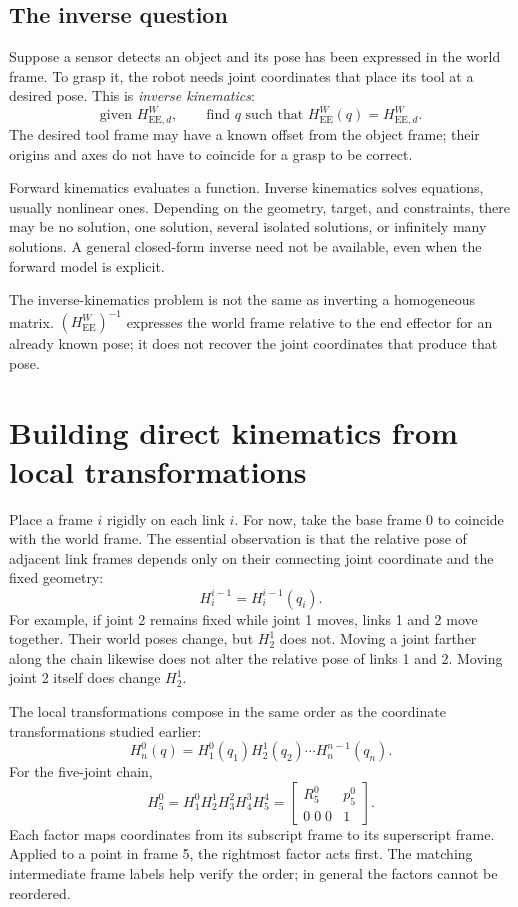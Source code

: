 \subsection{The inverse question}
Suppose a sensor detects an object and its pose has been expressed in the
world frame. To grasp it, the robot needs joint coordinates that place its
tool at a desired pose. This is \emph{inverse kinematics}:
\begin{equation}
 \text{given }H_{\mathrm{EE},d}^W,\qquad
 \text{find }q\text{ such that }H_{\mathrm{EE}}^W(q)=H_{\mathrm{EE},d}^W.
 \label{eq:l10-inverse}
\end{equation}
The desired tool frame may have a known offset from the object frame;
their origins and axes do not have to coincide for a grasp to be correct.

Forward kinematics evaluates a function. Inverse kinematics solves
equations, usually nonlinear ones. Depending on the geometry, target,
and constraints, there may be no solution, one solution, several isolated
solutions, or infinitely many solutions. A general closed-form inverse
need not be available, even when the forward model is explicit.

The inverse-kinematics problem is not the same as inverting a homogeneous
matrix. $(H_{\mathrm{EE}}^W)^{-1}$ expresses the world frame relative to
the end effector for an already known pose; it does not recover the joint
coordinates that produce that pose.

\section{Building direct kinematics from local transformations}
Place a frame $i$ rigidly on each link $i$. For now, take the base frame 0
to coincide with the world frame. The essential observation is that the
relative pose of adjacent link frames depends only on their connecting
joint coordinate and the fixed geometry:
\begin{equation}
 H_i^{i-1}=H_i^{i-1}(q_i).
 \label{eq:l10-local}
\end{equation}
For example, if joint 2 remains fixed while joint 1 moves, links 1 and 2
move together. Their world poses change, but $H_2^1$ does not. Moving a
joint farther along the chain likewise does not alter the relative pose
of links 1 and 2. Moving joint 2 itself does change $H_2^1$.

The local transformations compose in the same order as the coordinate
transformations studied earlier:
\begin{equation}
 \boxed{H_n^0(q)=H_1^0(q_1)H_2^1(q_2)\cdots H_n^{n-1}(q_n).}
 \label{eq:l10-product}
\end{equation}
For the five-joint chain,
\[
 H_5^0=H_1^0H_2^1H_3^2H_4^3H_5^4
 =\begin{bmatrix}R_5^0&p_5^0\\0\;0\;0&1\end{bmatrix}.
\]
Each factor maps coordinates from its subscript frame to its superscript
frame. Applied to a point in frame 5, the rightmost factor acts first.
The matching intermediate frame labels help verify the order; in general
the factors cannot be reordered.

